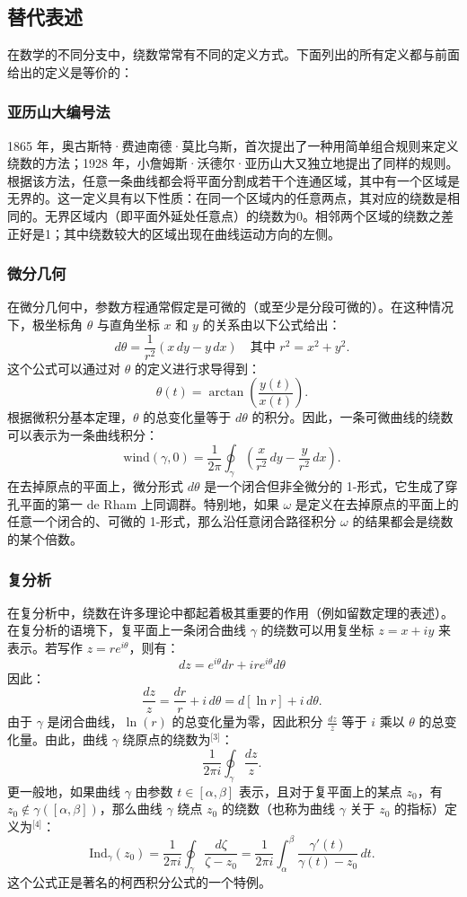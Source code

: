 \subsection{替代表述}
在数学的不同分支中，绕数常常有不同的定义方式。下面列出的所有定义都与前面给出的定义是等价的：
\subsubsection{亚历山大编号法}
1865 年，奥古斯特·费迪南德·莫比乌斯，首次提出了一种用简单组合规则来定义绕数的方法；1928 年，小詹姆斯·沃德尔·亚历山大又独立地提出了同样的规则。根据该方法，任意一条曲线都会将平面分割成若干个连通区域，其中有一个区域是无界的。这一定义具有以下性质：在同一个区域内的任意两点，其对应的绕数是相同的。无界区域内（即平面外延处任意点）的绕数为0。相邻两个区域的绕数之差正好是1；其中绕数较大的区域出现在曲线运动方向的左侧。
\subsubsection{微分几何}
在微分几何中，参数方程通常假定是可微的（或至少是分段可微的）。在这种情况下，极坐标角 $\theta$ 与直角坐标 $x$ 和 $y$ 的关系由以下公式给出：
$$
d\theta = \frac{1}{r^{2}}\left(x\,dy - y\,dx\right)
\quad\text{其中 } r^{2} = x^{2} + y^{2}.~
$$
这个公式可以通过对 $\theta$ 的定义进行求导得到：
$$
\theta(t) = \arctan\!\left(\frac{y(t)}{x(t)}\right).~
$$
根据微积分基本定理，$\theta$ 的总变化量等于 $d\theta$ 的积分。因此，一条可微曲线的绕数可以表示为一条曲线积分：
$$
\text{wind}(\gamma, 0) = 
\frac{1}{2\pi} 
\oint_{\gamma} 
\left(\frac{x}{r^{2}}\,dy - \frac{y}{r^{2}}\,dx\right).~
$$
在去掉原点的平面上，微分形式 $d\theta$ 是一个闭合但非全微分的 1-形式，它生成了穿孔平面的第一 de Rham 上同调群。特别地，如果 $\omega$ 是定义在去掉原点的平面上的任意一个闭合的、可微的 1-形式，那么沿任意闭合路径积分 $\omega$ 的结果都会是绕数的某个倍数。
\subsubsection{复分析}
在复分析中，绕数在许多理论中都起着极其重要的作用（例如留数定理的表述）。在复分析的语境下，复平面上一条闭合曲线 $\gamma$ 的绕数可以用复坐标 $z = x + iy$ 来表示。若写作 $z = r e^{i\theta}$，则有：
$$
dz = e^{i\theta}dr + i r e^{i\theta} d\theta~
$$
因此：
$$
\frac{dz}{z} = \frac{dr}{r} + i\,d\theta = d[\ln r] + i\,d\theta.~
$$
由于 $\gamma$ 是闭合曲线，$\ln(r)$ 的总变化量为零，因此积分 $\frac{dz}{z}$ 等于 $i$ 乘以 $\theta$ 的总变化量。由此，曲线 $\gamma$ 绕原点的绕数为\(^\text{[3]}\)：
$$
\frac{1}{2\pi i} \oint_{\gamma} \frac{dz}{z}.~
$$
更一般地，如果曲线 $\gamma$ 由参数 $t \in [\alpha, \beta]$ 表示，且对于复平面上的某点 $z_0$，有 $z_0 \notin \gamma([\alpha, \beta])$，那么曲线 $\gamma$ 绕点 $z_0$ 的绕数（也称为曲线 $\gamma$ 关于 $z_0$ 的指标）定义为\(^\text{[4]}\)：
$$
\mathrm{Ind}_{\gamma}(z_0)
= \frac{1}{2\pi i} \oint_{\gamma} \frac{d\zeta}{\zeta - z_0}
= \frac{1}{2\pi i} \int_{\alpha}^{\beta} 
\frac{\gamma'(t)}{\gamma(t) - z_0}\, dt.~
$$
这个公式正是著名的柯西积分公式的一个特例。
